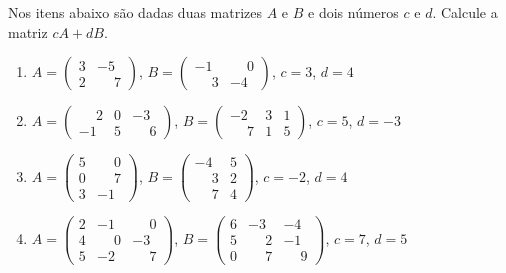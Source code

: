 \documentclass[12pt]{exam}
\begin{document}
\begin{exercicio}
    Nos itens abaixo são dadas duas matrizes $A$ e $B$ e dois números $c$ e $d$. Calcule a matriz $cA + dB$.
    \begin{enumerate}[label={\alph*})]
        \item $A = \begin{pmatrix}3 & -5\\2 & \phantom{-} 7\end{pmatrix}$, $B = \begin{pmatrix}-1 & \phantom{-} 0\\\phantom{-} 3 & -4\end{pmatrix}$, $c = 3$, $d = 4$
        \item $A = \begin{pmatrix}\phantom{-} 2 & 0 & -3\\-1 & 5 & \phantom{-} 6\end{pmatrix}$, $B = \begin{pmatrix}-2 & 3 & 1\\\phantom{-} 7 & 1 & 5\end{pmatrix}$, $c = 5$, $d = -3$
        \item $A = \begin{pmatrix}5 & \phantom{-} 0\\0 & \phantom{-} 7\\3 & -1\end{pmatrix}$, $B = \begin{pmatrix}-4 & 5\\\phantom{-} 3 & 2\\\phantom{-} 7 & 4\end{pmatrix}$, $c = -2$, $d = 4$
        \item $A = \begin{pmatrix}2 & -1 & \phantom{-} 0\\4 & \phantom{-} 0 & -3\\5 & -2 & \phantom{-} 7\end{pmatrix}$, $B = \begin{pmatrix}6 & -3 & -4\\5 & \phantom{-} 2 & -1\\0 & \phantom{-} 7 & \phantom{-} 9\end{pmatrix}$, $c = 7$, $d = 5$
    \end{enumerate}
\end{exercicio}
\end{document}
